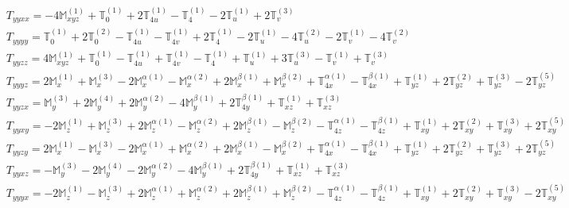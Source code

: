 \documentclass[fleqn,8pt,landscape]{jsarticle}
\begin{document}
\begin{align*}
& T_{yyxx} = - 4 \mathbb{M}_{xyz}^{(1)} + \mathbb{T}_{0}^{(1)} + 2 \mathbb{T}_{4u}^{(1)} - \mathbb{T}_{4}^{(1)} - 2 \mathbb{T}_{u}^{(1)} + 2 \mathbb{T}_{v}^{(3)} \\
& T_{yyyy} = \mathbb{T}_{0}^{(1)} + 2 \mathbb{T}_{0}^{(2)} - \mathbb{T}_{4u}^{(1)} - \mathbb{T}_{4v}^{(1)} + 2 \mathbb{T}_{4}^{(1)} - 2 \mathbb{T}_{u}^{(1)} - 4 \mathbb{T}_{u}^{(2)} - 2 \mathbb{T}_{v}^{(1)} - 4 \mathbb{T}_{v}^{(2)} \\
& T_{yyzz} = 4 \mathbb{M}_{xyz}^{(1)} + \mathbb{T}_{0}^{(1)} - \mathbb{T}_{4u}^{(1)} + \mathbb{T}_{4v}^{(1)} - \mathbb{T}_{4}^{(1)} + \mathbb{T}_{u}^{(1)} + 3 \mathbb{T}_{u}^{(3)} - \mathbb{T}_{v}^{(1)} + \mathbb{T}_{v}^{(3)} \\
& T_{yyyz} = 2 \mathbb{M}_{x}^{(1)} + \mathbb{M}_{x}^{(3)} - 2 \mathbb{M}_{x}^{\alpha(1)} - \mathbb{M}_{x}^{\alpha(2)} + 2 \mathbb{M}_{x}^{\beta(1)} + \mathbb{M}_{x}^{\beta(2)} + \mathbb{T}_{4x}^{\alpha(1)} - \mathbb{T}_{4x}^{\beta(1)} + \mathbb{T}_{yz}^{(1)} + 2 \mathbb{T}_{yz}^{(2)} + \mathbb{T}_{yz}^{(3)} - 2 \mathbb{T}_{yz}^{(5)} \\
& T_{yyzx} = \mathbb{M}_{y}^{(3)} + 2 \mathbb{M}_{y}^{(4)} + 2 \mathbb{M}_{y}^{\alpha(2)} - 4 \mathbb{M}_{y}^{\beta(1)} + 2 \mathbb{T}_{4y}^{\beta(1)} + \mathbb{T}_{xz}^{(1)} + \mathbb{T}_{xz}^{(3)} \\
& T_{yyxy} = - 2 \mathbb{M}_{z}^{(1)} + \mathbb{M}_{z}^{(3)} + 2 \mathbb{M}_{z}^{\alpha(1)} - \mathbb{M}_{z}^{\alpha(2)} + 2 \mathbb{M}_{z}^{\beta(1)} - \mathbb{M}_{z}^{\beta(2)} - \mathbb{T}_{4z}^{\alpha(1)} - \mathbb{T}_{4z}^{\beta(1)} + \mathbb{T}_{xy}^{(1)} + 2 \mathbb{T}_{xy}^{(2)} + \mathbb{T}_{xy}^{(3)} + 2 \mathbb{T}_{xy}^{(5)} \\
& T_{yyzy} = 2 \mathbb{M}_{x}^{(1)} - \mathbb{M}_{x}^{(3)} - 2 \mathbb{M}_{x}^{\alpha(1)} + \mathbb{M}_{x}^{\alpha(2)} + 2 \mathbb{M}_{x}^{\beta(1)} - \mathbb{M}_{x}^{\beta(2)} + \mathbb{T}_{4x}^{\alpha(1)} - \mathbb{T}_{4x}^{\beta(1)} + \mathbb{T}_{yz}^{(1)} + 2 \mathbb{T}_{yz}^{(2)} + \mathbb{T}_{yz}^{(3)} + 2 \mathbb{T}_{yz}^{(5)} \\
& T_{yyxz} = - \mathbb{M}_{y}^{(3)} - 2 \mathbb{M}_{y}^{(4)} - 2 \mathbb{M}_{y}^{\alpha(2)} - 4 \mathbb{M}_{y}^{\beta(1)} + 2 \mathbb{T}_{4y}^{\beta(1)} + \mathbb{T}_{xz}^{(1)} + \mathbb{T}_{xz}^{(3)} \\
& T_{yyyx} = - 2 \mathbb{M}_{z}^{(1)} - \mathbb{M}_{z}^{(3)} + 2 \mathbb{M}_{z}^{\alpha(1)} + \mathbb{M}_{z}^{\alpha(2)} + 2 \mathbb{M}_{z}^{\beta(1)} + \mathbb{M}_{z}^{\beta(2)} - \mathbb{T}_{4z}^{\alpha(1)} - \mathbb{T}_{4z}^{\beta(1)} + \mathbb{T}_{xy}^{(1)} + 2 \mathbb{T}_{xy}^{(2)} + \mathbb{T}_{xy}^{(3)} - 2 \mathbb{T}_{xy}^{(5)} \\

\end{align*}
\end{document}
